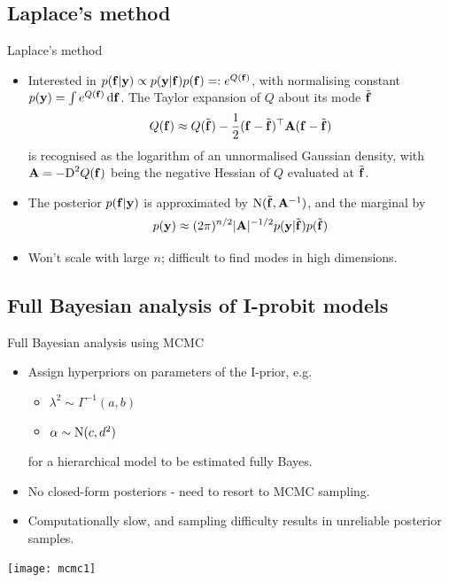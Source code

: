\subsection{Laplace's method}
\begin{frame}{Laplace's method}
  \vspace{-15pt}
  \begin{itemize}[<+->]\setlength\itemsep{0.8em}
    \item Interested in $p({\mathbf f}|{\mathbf y}) \propto p({\mathbf y}|{\mathbf f})p({\mathbf f}) =: e^{Q({\mathbf f})}$, with normalising constant $p({\mathbf y}) = \int e^{Q({\mathbf f})} \, \text{d}{\mathbf f}$. The Taylor expansion of $Q$ about its mode $\tilde{{\mathbf f}}$
    \[
      Q({\mathbf f}) \approx Q(\tilde{{\mathbf f}}) - \frac{1}{2} ({\mathbf f} - \tilde{{\mathbf f}})^\top{\mathbf A}({\mathbf f} - \tilde{{\mathbf f}}) 
    \]
    is recognised as the logarithm of an unnormalised Gaussian density, with ${\mathbf A} = -\text{D}^2 Q({\mathbf f})$ being the negative Hessian of $Q$ evaluated at  $\tilde{{\mathbf f}}$.
    \item The posterior $p({\mathbf f}|{\mathbf y})$ is approximated by $\operatorname{N}(\tilde{{\mathbf f}}, {\mathbf A}^{-1})$, and the marginal by
    \[
      p({\mathbf y}) \approx (2\pi)^{n/2} \vert {\mathbf A} \vert^{-1/2}  p({\mathbf y}|\tilde{{\mathbf f}})p(\tilde{{\mathbf f}})
    \]
    \item Won't scale with large $n$; difficult to find modes in high dimensions.
  \end{itemize}
\end{frame}

\subsection{Full Bayesian analysis of I-probit models}
\begin{frame}{Full Bayesian analysis using MCMC}
  \vspace{-3pt}
  \begin{itemize}\setlength\itemsep{0.5em}
    \item Assign hyperpriors on parameters of the I-prior, e.g.
    \begin{itemize}
      \item $\lambda^2 \sim \Gamma^{-1}(a,b)$
      \item $\alpha \sim \operatorname{N}(c,d^2)$
    \end{itemize}
    for a hierarchical model to be estimated fully Bayes.
    \item No closed-form posteriors - need to resort to MCMC sampling.
    \item Computationally slow, and sampling difficulty results in unreliable posterior samples.
  \end{itemize}
  \begin{center}
    \texttt{[image: mcmc1]}
  \end{center}
\end{frame}

